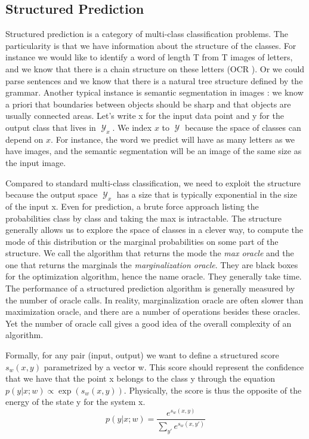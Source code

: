 \documentclass{article}
\DeclareMathOperator{\1}{\mathbb{1}}
\DeclareMathOperator{\Y}{\mathcal{Y}}
\begin{document}
\subsection{Structured Prediction}

Structured prediction is a category of multi-class classification problems.
The particularity is that we have information about the structure of the classes.
For instance we would like to identify a word of length T from T images of letters, and we know that there is a chain structure on these letters (OCR ).
Or we could parse sentences and we know that there is a natural tree structure defined by the grammar.
Another typical instance is semantic segmentation in images : we know a priori that boundaries between objects should be sharp and that objects are usually connected areas.
Let's write x for the input data point and y for the output class that lives in $\Y_x$.
We index $x$ to $\Y$ because the space of classes can depend on $x$.
For instance, the word we predict will have as many letters as we have images, and the semantic segmentation will be an image of the same size as the input image. 

Compared to standard multi-class classification, we need to exploit the structure because the output space $\Y_x$ has a size that is typically exponential in the size of the input x.
Even for prediction, a brute force approach listing the probabilities class by class and taking the max is intractable.
The structure generally allows us to explore the space of classes in a clever way, to compute the mode of this distribution or the marginal probabilities on some part of the structure.
We call the algorithm that returns the mode the \textit{max oracle} and the one that returns the marginals the \textit{marginalization oracle}.
They are black boxes for the optimization algorithm, hence the name oracle.
They generally take time.
The performance of a structured prediction algorithm is generally measured by the number of oracle calls.
In reality, marginalization oracle are often slower than maximization oracle, and there are a number of operations besides these oracles.
Yet the number of oracle call gives a good idea of the overall complexity of an algorithm.

Formally, for any pair (input, output) we want to define a structured score $s_w(x, y)$ parametrized by a vector w.
This score should represent the confidence that we have that the point x belongs to the class y through the equation $p(y|x ; w)\propto \exp(s_w(x, y))$.
Physically, the score  is thus the opposite of the energy of the state y for the system x. 
\begin{equation}
	p(y|x; w)=  \frac{e^{s_w(x, y)}}{\sum_{y'} e^{s_w(x, y')}}
\end{equation}
\end{document}
